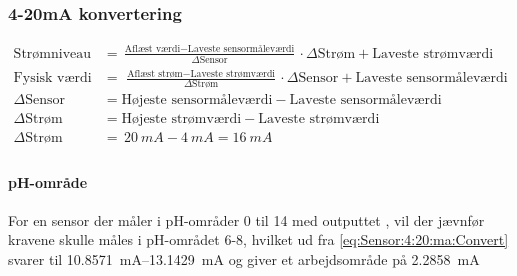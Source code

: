 
\subsubsection{4-20mA konvertering}
\begin{equation}\label{eq:Sensor:4:20:ma:Convert}
	\begin{split}
		\textrm{Strømniveau}   & =   \frac{\textrm{Aflæst værdi} - \textrm{Laveste sensormåleværdi} }{\Delta \textrm{Sensor}} \cdot \Delta \textrm{Strøm} + \textrm{Laveste strømværdi} \\
		\textrm{Fysisk værdi}  & =\,  \frac{\textrm{Aflæst strøm} - \textrm{Laveste strømværdi} }{\Delta\textrm{Strøm}} \cdot \Delta \textrm{Sensor}  + \textrm{Laveste sensormåleværdi} \\
		\Delta \textrm{Sensor} & =  \textrm{Højeste sensormåleværdi} - \textrm{Laveste sensormåleværdi}                                                                                               \\
		\Delta \textrm{Strøm}  & =  \textrm{Højeste strømværdi} -\textrm{Laveste strømværdi}                                            \\
		\Delta \textrm{Strøm}  & =\, \SI{20}{mA} -\SI{4}{mA} = \SI{16}{mA}                                                                                                                            \\
	\end{split}
\end{equation}

\paragraph{pH-område}
For en sensor der måler i pH-områder 0 til 14\cite{NewportpHsensor,HachpHsensor} med outputtet \fourtwenty, vil der jævnfør kravene skulle måles i pH-området 6-8, hvilket ud fra \eqref{eq:Sensor:4:20:ma:Convert} svarer til \SIrange{10.8571}{13.1429}{mA} og giver et arbejdsområde på \SI{2.2858}{mA}

